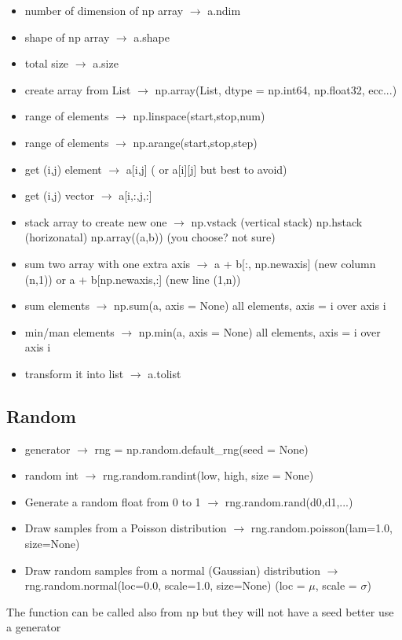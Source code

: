 \documentclass{article}
\begin{document}
\begin{itemize}
\item number of dimension of np array $\rightarrow$ a.ndim
\item shape of np array $\rightarrow$ a.shape
\item total size  $\rightarrow$ a.size
\item create array from List $\rightarrow$ np.array(List, dtype = np.int64, np.float32, ecc...)
\item range of elements $\rightarrow$ np.linspace(start,stop,num)
\item range of elements $\rightarrow$ np.arange(start,stop,step)
\item get (i,j) element $\rightarrow$ a[i,j] ( or  a[i][j]  but best to avoid)
\item get (i,j) vector $\rightarrow$ a[i,:,j,:] 
\item stack array to create new one $\rightarrow$ np.vstack (vertical stack) np.hstack (horizonatal) np.array((a,b)) (you choose? not sure)
\item sum two array with one extra axis   $\rightarrow$ a + b[:, np.newaxis] (new column (n,1)) or a + b[np.newaxis,:] (new line (1,n))
\item sum  elements  $\rightarrow$ np.sum(a, axis = None) all elements, axis = i over axis i
\item min/man  elements  $\rightarrow$ np.min(a, axis = None) all elements, axis = i over axis i
\item transform it into list $\rightarrow$ a.tolist
\end{itemize}
\subsection{Random}
\begin{itemize}
\item generator  $\rightarrow$ rng = np.random.default\_rng(seed = None)
\item random int $\rightarrow$  rng.random.randint(low, high, size = None)
\item Generate a random float from 0 to 1 $\rightarrow$ rng.random.rand(d0,d1,...)
\item Draw samples from a Poisson distribution $\rightarrow$ rng.random.poisson(lam=1.0, size=None)
\item Draw random samples from a normal (Gaussian) distribution $\rightarrow$ rng.random.normal(loc=0.0, scale=1.0, size=None) (loc = $\mu$, scale = $\sigma$)
\end{itemize}
The function can be called also from np but they will not have a seed better use a generator
\end{document}

